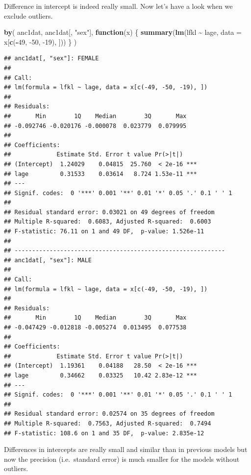 \documentclass[
  12pt,
]{book}
\newenvironment{Shaded}{\begin{snugshade}}{\end{snugshade}}
\newcommand{\ControlFlowTok}[1]{\textcolor[rgb]{0.13,0.29,0.53}{\textbf{#1}}}
\newcommand{\DataTypeTok}[1]{\textcolor[rgb]{0.13,0.29,0.53}{#1}}
\newcommand{\DecValTok}[1]{\textcolor[rgb]{0.00,0.00,0.81}{#1}}
\newcommand{\KeywordTok}[1]{\textcolor[rgb]{0.13,0.29,0.53}{\textbf{#1}}}
\newcommand{\NormalTok}[1]{#1}
\newcommand{\OperatorTok}[1]{\textcolor[rgb]{0.81,0.36,0.00}{\textbf{#1}}}
\newcommand{\StringTok}[1]{\textcolor[rgb]{0.31,0.60,0.02}{#1}}
\begin{document}
Difference in intercept is indeed really small. Now let's have a look when we exclude outliers.

\begin{Shaded}
\begin{Highlighting}[]
\KeywordTok{by}\NormalTok{(}
\NormalTok{  anc1dat,}
\NormalTok{  anc1dat[, }\StringTok{"sex"}\NormalTok{],}
  \ControlFlowTok{function}\NormalTok{(x) \{}
    \KeywordTok{summary}\NormalTok{(}\KeywordTok{lm}\NormalTok{(lfkl }\OperatorTok{\textasciitilde{}}\StringTok{ }\NormalTok{lage, }\DataTypeTok{data =}\NormalTok{ x[}\KeywordTok{c}\NormalTok{(}\OperatorTok{{-}}\DecValTok{49}\NormalTok{, }\DecValTok{{-}50}\NormalTok{, }\DecValTok{{-}19}\NormalTok{), ]))}
\NormalTok{  \}}
\NormalTok{)}
\end{Highlighting}
\end{Shaded}

\begin{verbatim}
## anc1dat[, "sex"]: FEMALE      
## 
## Call:
## lm(formula = lfkl ~ lage, data = x[c(-49, -50, -19), ])
## 
## Residuals:
##       Min        1Q    Median        3Q       Max 
## -0.092746 -0.020176 -0.000078  0.023779  0.079995 
## 
## Coefficients:
##             Estimate Std. Error t value Pr(>|t|)    
## (Intercept)  1.24029    0.04815  25.760  < 2e-16 ***
## lage         0.31533    0.03614   8.724 1.53e-11 ***
## ---
## Signif. codes:  0 '***' 0.001 '**' 0.01 '*' 0.05 '.' 0.1 ' ' 1
## 
## Residual standard error: 0.03021 on 49 degrees of freedom
## Multiple R-squared:  0.6083, Adjusted R-squared:  0.6003 
## F-statistic: 76.11 on 1 and 49 DF,  p-value: 1.526e-11
## 
## ------------------------------------------------------------ 
## anc1dat[, "sex"]: MALE        
## 
## Call:
## lm(formula = lfkl ~ lage, data = x[c(-49, -50, -19), ])
## 
## Residuals:
##       Min        1Q    Median        3Q       Max 
## -0.047429 -0.012818 -0.005274  0.013495  0.077538 
## 
## Coefficients:
##             Estimate Std. Error t value Pr(>|t|)    
## (Intercept)  1.19361    0.04188   28.50  < 2e-16 ***
## lage         0.34662    0.03325   10.42 2.83e-12 ***
## ---
## Signif. codes:  0 '***' 0.001 '**' 0.01 '*' 0.05 '.' 0.1 ' ' 1
## 
## Residual standard error: 0.02574 on 35 degrees of freedom
## Multiple R-squared:  0.7563, Adjusted R-squared:  0.7494 
## F-statistic: 108.6 on 1 and 35 DF,  p-value: 2.835e-12
\end{verbatim}

Differences in intercepts are really small and similar than in previous models but now the precision (i.e.~standard error) is much smaller for the models without outliers.
\end{document}
